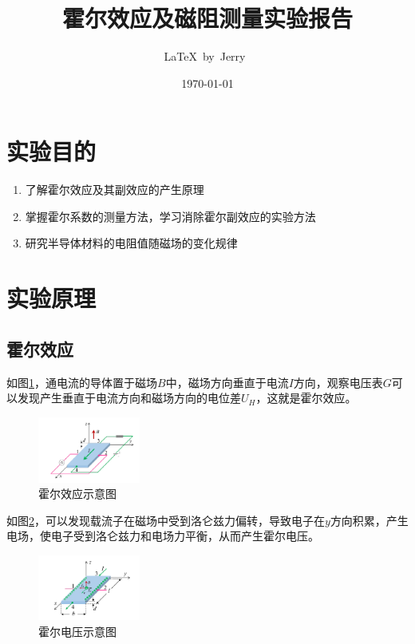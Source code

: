 \documentclass[UTF8]{ctexart}
\title{霍尔效应及磁阻测量实验报告}
\author{\LaTeX\ by\ Jerry\ }
\date{\today}
\begin{document}
\fancyfoot[C]{\thepage}

\maketitle
\newpage
\tableofcontents
\newpage

\section{实验目的}

\begin{enumerate}
    \item 了解霍尔效应及其副效应的产生原理
    \item 掌握霍尔系数的测量方法，学习消除霍尔副效应的实验方法
    \item 研究半导体材料的电阻值随磁场的变化规律
\end{enumerate}

\section{实验原理}

\subsection{霍尔效应}

如图\ref{Hall_effect}，通电流的导体置于磁场$B$中，磁场方向垂直于电流$I$方向，观察电压表$G$可以发现产生垂直于电流方向和磁场方向的电位差$U_H$，这就是霍尔效应。

\begin{center}
    \begin{figure}[H]
        \centering
        \includegraphics[width=0.3\textwidth]{img/Hall_effect.png}
        \caption{霍尔效应示意图}
        \label{Hall_effect}
    \end{figure}
\end{center}

如图\ref{Hall_voltage}，可以发现载流子在磁场中受到洛仑兹力偏转，导致电子在$y$方向积累，产生电场，使电子受到洛仑兹力和电场力平衡，从而产生霍尔电压。

\begin{center}
    \begin{figure}[H]
        \centering
        \includegraphics[width=0.3\textwidth]{img/Hall_voltage.png}
        \caption{霍尔电压示意图}
        \label{Hall_voltage}
    \end{figure}
\end{center}
\end{document}
